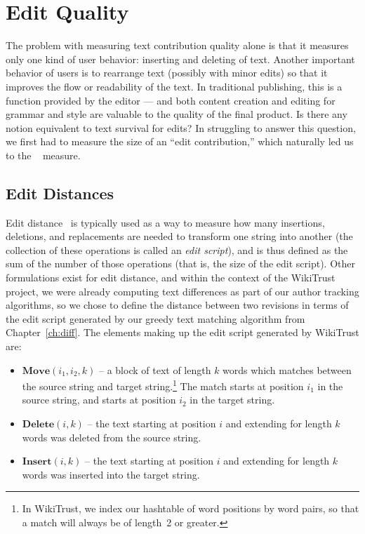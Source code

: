 \section{Edit Quality}
\label{sec:editquality}

The problem with measuring text contribution quality alone is that it
measures only one kind of user behavior: inserting and deleting of text.
Another important behavior of users is to rearrange text
(possibly with minor edits) so that it improves the flow or
readability of the text.
In traditional publishing, this is a function provided by the
editor --- and both content creation and editing for grammar and
style are valuable to the quality of the final product.
Is there any notion equivalent to text survival for edits?
In struggling to answer this question, we first had to measure
the size of an ``edit contribution,'' which naturally led us to the
~\cite{Levenshtein1966,Tichy1984,Cormode2007,Adler2007}
measure.

\subsection{Edit Distances}
\label{sec:eq-distances}

Edit distance~\cite{Levenshtein1966} is typically used as a way to
measure how many insertions, deletions, and replacements are needed to
transform one string into another (the collection of these operations
is called an \textit{edit script}), and is thus defined as the sum of the
number of those operations (that is, the size of the edit script).
Other formulations exist for edit distance, and within the
context of the WikiTrust project, we were already computing
text differences as part of our author tracking algorithms,
so we chose to define the distance between two revisions
in terms of the edit script generated by our greedy text
matching algorithm from Chapter~\ref{ch:diff}.
The elements making up the edit script generated by WikiTrust are:
\begin{itemize}
\item $\mathbf{Move}(i_1, i_2, k)$ -- a block of text of
    length $k$ words which matches between the source string
    and target string.\footnote{In WikiTrust, we index our hashtable
    of word positions by word pairs, so that a match will always
    be of length~2 or greater.}
    The match starts at position $i_1$ in the source string,
    and starts at position $i_2$ in the target string.
\item $\mathbf{Delete}(i, k)$ -- the text starting at position $i$
    and extending for length $k$ words was deleted from the source string.
\item $\mathbf{Insert}(i, k)$ -- the text starting at position $i$
    and extending for length $k$ words was inserted into the target string.
\end{itemize}


